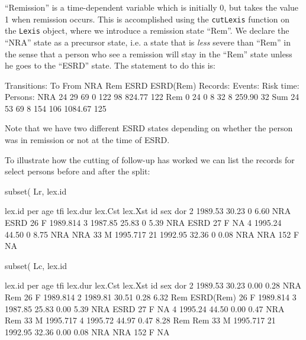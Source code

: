 \begin{enumerate}
  ``Remission'' is a time-dependent variable which is initially 0, but
  takes the value 1 when remission occurs. This is accomplished using
  the \texttt{cutLexis} function on the \texttt{Lexis} object, where
  we introduce a remission state ``Rem''. We declare the ``NRA'' state
  as a precursor state, i.e. a state that is \emph{less} severe than
  ``Rem'' in the sense that a person who see a remission will stay in
  the ``Rem'' state unless he goes to the ``ESRD'' state. The
  statement to do this is:
\begin{Schunk}
\begin{Soutput}
Transitions:
     To
From  NRA Rem ESRD ESRD(Rem)  Records:  Events: Risk time:  Persons:
  NRA  24  29   69         0       122       98     824.77       122
  Rem   0  24    0         8        32        8     259.90        32
  Sum  24  53   69         8       154      106    1084.67       125
\end{Soutput}
\end{Schunk}
Note that we have two different ESRD states depending on whether the
person was in remission or not at the time of ESRD.

To illustrate how the cutting of follow-up has worked we can list the
records for select persons before and after the split:
\begin{Schunk}
\begin{Sinput}
 subset( Lr, lex.id %in% c(2:4,21) )[,c(1:9,12)]
\end{Sinput}
\begin{Soutput}
 lex.id     per   age tfi lex.dur lex.Cst lex.Xst  id sex      dor
      2 1989.53 30.23   0    6.60     NRA    ESRD  26   F 1989.814
      3 1987.85 25.83   0    5.39     NRA    ESRD  27   F       NA
      4 1995.24 44.50   0    8.75     NRA     NRA  33   M 1995.717
     21 1992.95 32.36   0    0.08     NRA     NRA 152   F       NA
\end{Soutput}
\begin{Sinput}
 subset( Lc, lex.id %in% c(2:4,21) )[,c(1:9,12)]
\end{Sinput}
\begin{Soutput}
 lex.id     per   age  tfi lex.dur lex.Cst   lex.Xst  id sex      dor
      2 1989.53 30.23 0.00    0.28     NRA       Rem  26   F 1989.814
      2 1989.81 30.51 0.28    6.32     Rem ESRD(Rem)  26   F 1989.814
      3 1987.85 25.83 0.00    5.39     NRA      ESRD  27   F       NA
      4 1995.24 44.50 0.00    0.47     NRA       Rem  33   M 1995.717
      4 1995.72 44.97 0.47    8.28     Rem       Rem  33   M 1995.717
     21 1992.95 32.36 0.00    0.08     NRA       NRA 152   F       NA
\end{Soutput}
\end{Schunk}


\end{enumerate}
